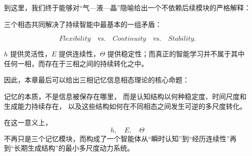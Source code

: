 到这里，我们终于能够对“气—液—晶”隐喻给出一个不依赖后续模块的严格解释：

\begin{statementbox}
\centering
{}
\end{statementbox}

三个相态共同解决了持续智能中最基本的一组矛盾：

\[
\boxed{
Flexibility
\quad\text{vs.}\quad
Continuity
\quad\text{vs.}\quad
Stability.
}
\]

$h$ 提供灵活性，$E$ 提供连续性，$\Theta$ 提供稳定性；而真正的智能学习并不属于其中任何一相，而存在于三相之间的持续转化之中。

因此，本章最后可以给出三相记忆信息相态理论的核心命题：

\begin{proposition*}
记忆的本质，不是信息被保存在哪里，
而是认知结构以何种稳定度、时间尺度和生成能力持续存在，
以及这些结构如何在不同相态之间发生可逆的多尺度转化。
\end{proposition*}

在这一意义上，
\[
h,\quad E,\quad\Theta
\]
不再只是三个记忆模块，而构成了一个智能体从“瞬时认知”到“经历连续性”再到“长期生成结构”的最小多尺度动力系统。
